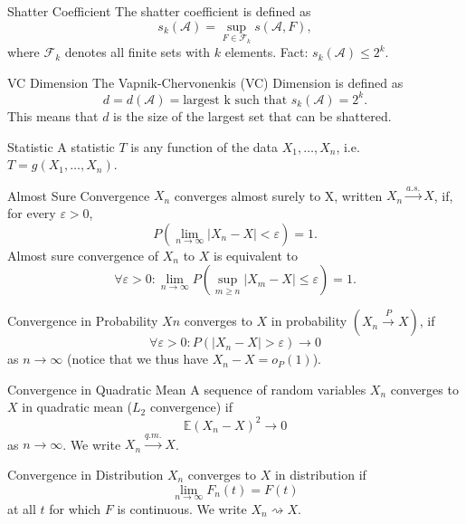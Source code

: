 \documentclass[avery5371,grid]{flashcards}
\begin{document}
\begin{flashcard}[Definition]{Shatter Coefficient}
 The shatter coefficient is defined as
 \[
 s_k(\mathcal{A}) = \sup_{F\in \mathcal{F}_k} s(\mathcal{A},F),
 \]
where $\mathcal{F}_k$ denotes all finite sets with $k$ elements. 
Fact: $s_k(\mathcal{A}) \le 2^k$. 
\end{flashcard}



\begin{flashcard}[Definition]{VC Dimension}
 The Vapnik-Chervonenkis (VC) Dimension is defined as
 \[
 d = d(\mathcal{A}) = \text{largest k such that } s_k(\mathcal{A}) = 2^k.
 \]
This means that $d$ is the size of the largest set that can be shattered.
\end{flashcard}

\begin{flashcard}[Definition]{Statistic}
A statistic $T$ is any function of the data $X_1, \ldots, X_n$, i.e. $T=g(X_1,\ldots,X_n)$.
\end{flashcard}

\begin{flashcard}[Definition]{Almost Sure Convergence}
$X_n$ converges almost surely to X, written $X_n \overset{a.s.}{\longrightarrow} X$, if, for every $\varepsilon > 0$, 
\[
P\left( \lim_{n \to \infty} \left| X_n - X \right| < \varepsilon \right) = 1.
\]
Almost sure convergence of $X_n$ to $X$ is equivalent to 
\[
\forall \varepsilon > 0: \lim_{n \to \infty} P\left( \sup_{m \ge n} \left| X_m - X \right| \le \varepsilon \right) = 1.
\]
\end{flashcard}

\begin{flashcard}[Definition]{Convergence in Probability}
$Xn$ converges to $X$ in probability $(X_n \overset{P}{\longrightarrow} X)$, if
\[
\forall \varepsilon > 0: P\left( \left| X_n - X \right| > \varepsilon \right) \to 0
\]
as $n \to \infty$ (notice that we thus have $X_n - X = o_P(1)$).
\end{flashcard}

\begin{flashcard}[Definition]{Convergence in Quadratic Mean}
A sequence of random variables $X_n$ converges to $X$ in quadratic mean ($L_2$ convergence) if 
\[
\mathbb{E}(X_n - X)^2 \to 0
\]
as $n \to \infty$. We write $X_n \overset{q.m.}{\longrightarrow} X$.
\end{flashcard}

\begin{flashcard}[Definition]{Convergence in Distribution}
 $X_n$ converges to $X$ in distribution if 
 \[
 \lim_{n \to \infty} F_n(t) = F(t)
 \]
 at all $t$ for which $F$ is continuous. We write $X_n \rightsquigarrow X$.
\end{flashcard}
\end{document}

